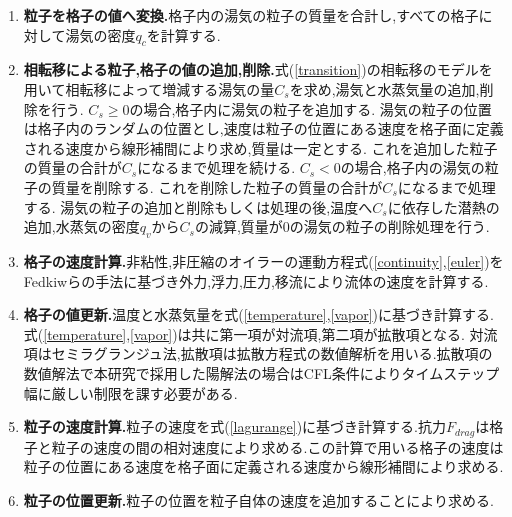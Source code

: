 \documentclass[submit,techrep]{ipsj}
\begin{document}
\begin{enumerate}
\item {\bf 粒子を格子の値へ変換.}格子内の湯気の粒子の質量を合計し,すべての格子に対して湯気の密度$q_{c}$を計算する.
\item {\bf 相転移による粒子,格子の値の追加,削除.}式(\ref{transition})の相転移のモデルを用いて相転移によって増減する湯気の量$C_{s}$を求め,湯気と水蒸気量の追加,削除を行う.
$C_{s} \geq 0$の場合,格子内に湯気の粒子を追加する.
湯気の粒子の位置は格子内のランダムの位置とし,速度は粒子の位置にある速度を格子面に定義される速度から線形補間により求め,質量は一定とする.
これを追加した粒子の質量の合計が$C_{s}$になるまで処理を続ける.
$C_{s} < 0$の場合,格子内の湯気の粒子の質量を削除する.
これを削除した粒子の質量の合計が$C_{s}$になるまで処理する.
湯気の粒子の追加と削除もしくは処理の後,温度へ$C_{s}$に依存した潜熱の追加,水蒸気の密度$q_{v}$から$C_{s}$の減算,質量が0の湯気の粒子の削除処理を行う.
\item {\bf 格子の速度計算.}非粘性,非圧縮のオイラーの運動方程式(\ref{continuity},\ref{euler})をFedkiwら\cite{Fedkiw2001}の手法に基づき外力,浮力,圧力,移流により流体の速度を計算する.
\item {\bf 格子の値更新.}温度と水蒸気量を式(\ref{temperature},\ref{vapor})に基づき計算する.式(\ref{temperature},\ref{vapor})は共に第一項が対流項,第二項が拡散項となる.
対流項はセミラグランジュ法,拡散項は拡散方程式の数値解析を用いる.拡散項の数値解法で本研究で採用した陽解法の場合はCFL条件によりタイムステップ幅に厳しい制限を課す必要がある.
\item {\bf 粒子の速度計算.}粒子の速度を式(\ref{lagurange})に基づき計算する.抗力$F_{drag}$は格子と粒子の速度の間の相対速度により求める.この計算で用いる格子の速度は粒子の位置にある速度を格子面に定義される速度から線形補間により求める.
\item {\bf 粒子の位置更新.}粒子の位置を粒子自体の速度を追加することにより求める.
\end{enumerate}
\end{document}
